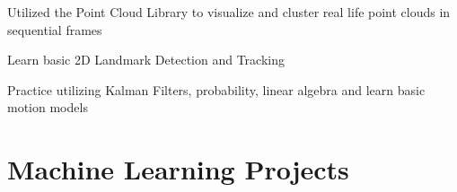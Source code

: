 \documentclass[letterpaper]{resume}
\begin{document}
\begin{compactitem}
\item Utilized the Point Cloud Library to visualize and cluster real life point clouds in sequential frames
\end{compactitem}

\begin{compactitem}
\item Learn basic 2D Landmark Detection and Tracking
\item Practice utilizing Kalman Filters, probability, linear algebra and learn basic motion models
\end{compactitem}

\section{Machine Learning Projects}

% 
\end{document}
